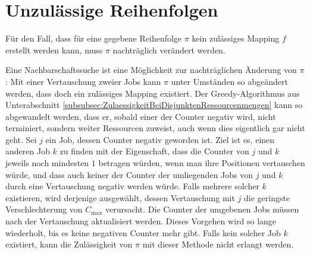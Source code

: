 \documentclass{scrreprt}
\begin{document}
\section{Unzulässige Reihenfolgen}
\label{UnzulaessigeReihenfolgen}
Für den Fall, dass für eine gegebene Reihenfolge $\pi$ kein zulässiges Mapping $f$ erstellt werden kann, muss $\pi$ nachträglich verändert werden.

Eine Nachbarschaftssuche ist eine Möglichkeit zur nachträglichen Änderung von $\pi$:
Mit einer Vertauschung zweier Jobs kann $\pi$ unter Umständen so abgeändert werden, dass doch ein zulässiges Mapping existiert.
Der Greedy-Algorithmus aus Unterabschnitt \ref{subsubsec:ZulaessigkeitBeiDisjunktenRessourcenmengen} kann so abgewandelt werden,
dass er, sobald einer der Counter negativ wird, nicht terminiert, sondern weiter Ressourcen zuweist, auch wenn dies eigentlich gar nicht geht.
Sei $j$ ein Job, dessen Counter negativ geworden ist.
Ziel ist es, einen anderen Job $k$ zu finden mit der Eigenschaft, dass die Counter von $j$ und $k$ jeweils noch mindesten $1$ betragen würden, 
wenn man ihre Positionen vertauschen würde,
und dass auch keiner der Counter der umliegenden Jobs von $j$ und $k$ durch eine Vertauschung negativ werden würde.
Falls mehrere solcher $k$ existieren, wird derjenige ausgewählt, dessen Vertauschung mit $j$ die geringste Verschlechterung von $C_{\max}$ verursacht.
Die Counter der umgebenen Jobs müssen nach der Vertauschung aktualisiert werden.
Dieses Vorgehen wird so lange wiederholt, bis es keine negativen Counter mehr gibt.
Falls kein solcher Job $k$ existiert, kann die Zulässigkeit von $\pi$ mit dieser Methode nicht erlangt werden.


\end{document}
